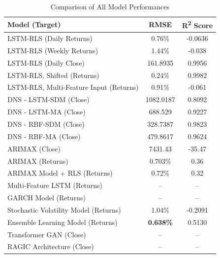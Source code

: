 \begin{table}[h!]
    \centering
    \caption{Comparison of All Model Performances}
    \label{tab:all_model_comparison}
    \begin{tabular}{|l|c|c|}
    \hline
    \textbf{Model (Target)} & \textbf{RMSE} & \textbf{R\textsuperscript{2} Score} \\ \hline
    
    LSTM-RLS (Daily Returns) & 0.76\% & -0.0636 \\ \hline
    LSTM-RLS (Weekly Returns) & 1.44\% & -0.038 \\ \hline
    LSTM-RLS (Daily Close) & 161.8935 & 0.9956 \\ \hline
    LSTM-RLS, Shifted (Returns) & 0.24\% & 0.9982 \\ \hline
    LSTM-RLS, Multi-Feature Input (Returns) & 0.91\% & -0.061 \\ \hline
    
    DNS - LSTM-SDM (Close) & 1082.0187 & 0.8092 \\ \hline
    DNS - LSTM-MA (Close) & 688.529 & 0.9227 \\ \hline
    DNS - RBF-SDM (Close) & 328.7387 & 0.9823 \\ \hline
    DNS - RBF-MA (Close) & 479.8617 & 0.9624 \\ \hline
    
    ARIMAX (Close) & 7431.43 & -35.47 \\ \hline
    ARIMAX (Returns) & 0.703\% & 0.36 \\ \hline
    ARIMAX Model + RLS (Returns) & 0.72\% & 0.32 \\ \hline
    
    Multi-Feature LSTM (Returns) & -- & -- \\ \hline
    GARCH Model (Returns) & -- & -- \\ \hline
    Stochastic Volatility Model (Returns) & 1.04\% & -0.2091 \\ \hline
    Ensemble Learning Model (Returns) & \textbf{0.638\%} & 0.5130 \\ \hline
    Transformer GAN (Close) & -- & -- \\ \hline
    RAGIC Architecture (Close) & -- & -- \\ \hline
    
    \end{tabular}
\end{table}

